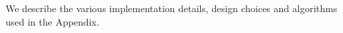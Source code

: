 \appendix
\chapter{}
We describe the various implementation details, design choices and algorithms used in the Appendix.

